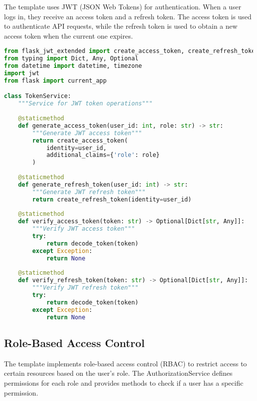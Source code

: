 \documentclass{article}
\begin{document}
The template uses JWT (JSON Web Tokens) for authentication. When a user logs in, they receive an access token and a refresh token. The access token is used to authenticate API requests, while the refresh token is used to obtain a new access token when the current one expires.

\begin{lstlisting}[language=python, caption=Token Service in app/services/token\_service.py]
from flask_jwt_extended import create_access_token, create_refresh_token, decode_token
from typing import Dict, Any, Optional
from datetime import datetime, timezone
import jwt
from flask import current_app

class TokenService:
    """Service for JWT token operations"""
    
    @staticmethod
    def generate_access_token(user_id: int, role: str) -> str:
        """Generate JWT access token"""
        return create_access_token(
            identity=user_id,
            additional_claims={'role': role}
        )
    
    @staticmethod
    def generate_refresh_token(user_id: int) -> str:
        """Generate JWT refresh token"""
        return create_refresh_token(identity=user_id)
    
    @staticmethod
    def verify_access_token(token: str) -> Optional[Dict[str, Any]]:
        """Verify JWT access token"""
        try:
            return decode_token(token)
        except Exception:
            return None
    
    @staticmethod
    def verify_refresh_token(token: str) -> Optional[Dict[str, Any]]:
        """Verify JWT refresh token"""
        try:
            return decode_token(token)
        except Exception:
            return None
\end{lstlisting}

\subsection{Role-Based Access Control}

The template implements role-based access control (RBAC) to restrict access to certain resources based on the user's role. The AuthorizationService defines permissions for each role and provides methods to check if a user has a specific permission.
\end{document}
